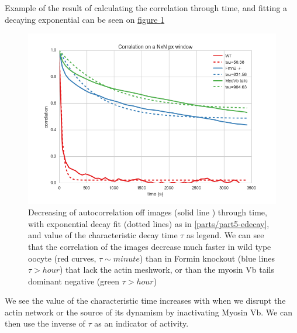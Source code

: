\documentclass[A4paperpaper,11pt,english]{sphinxmanual}
\begin{document}
Example of the result of calculating the correlation through time, and fitting
a decaying exponential can be seen on \hyperref[parts/part5:fig-exp-decay]{figure  \ref*{parts/part5:fig-exp-decay}}
\begin{figure}[htbp]
\centering
\capstart

\includegraphics[width=0.650\linewidth]{corrtime.png}
\caption{Decreasing of autocorrelation off images  (solid line ) through time, with
exponential decay fit (dotted lines) as in \eqref{parts/part5-edecay}, and value of the
characteristic decay time \(\tau\) as legend. We can see that the
correlation of the images decrease much faster in wild type oocyte (red
curves, \(\tau \sim minute\)) than in Formin knockout (blue lines
\(\tau > hour\)) that lack the actin meshwork, or than the myosin Vb
tails dominant negative (green \(\tau > hour\))}\label{parts/part5:fig-exp-decay}\end{figure}

We see the value of the characteristic time increases with when we disrupt the
actin network or the  source of its dynamism by inactivating Myosin Vb. We can
then use the inverse of \(\tau\) as an indicator of activity.
\end{document}
